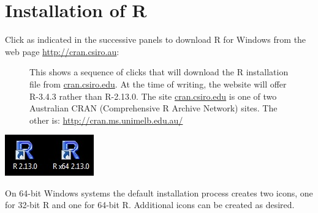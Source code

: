



\section{Installation of R}

Click as indicated in the successive panels to download R for
Windows from the web page \url{http://cran.csiro.au}:
\vspace*{-3pt}

\begin{figure}
\vspace*{2pt}

\vspace*{2pt}

\caption{This shows a sequence of clicks that will download
  the R installation file from \url{cran.csiro.edu}. At the time of writing,
  the website will offer R-3.4.3 rather than R-2.13.0. The site
  \url{cran.csiro.edu} is one of two Australian CRAN (Comprehensive R Archive
  Network) sites. The other is:
  \url{http://cran.ms.unimelb.edu.au/}}
\end{figure}

\begin{marginfigure}
\begin{center}
\begin{minipage}[c]{0.8\textwidth}
\includegraphics{figs-inc/01i-icons.jpg}
\end{minipage}
\end{center}
\caption{On 64-bit Windows systems the default installation
process creates two icons, one for 32-bit R and one for 64-bit R.
Additional icons can be created as desired.
}
\end{marginfigure}

